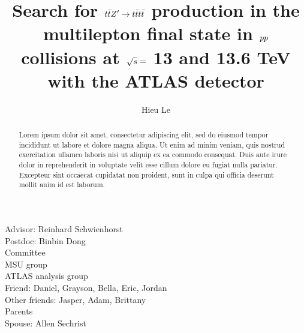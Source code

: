 \documentclass{msuphddissertation}
\author{Hieu Le} %
\title{Search for $\lowercase{\ttbar}Z' \rightarrow \lowercase{\tttt}$ production in the multilepton final state in $\lowercase{pp}$ collisions at \lowercase{$\sqrt{s}=$} 13 and 13.6 TeV with the ATLAS detector} %
\begin{document}
\maketitlepage %


\begin{abstract}
Lorem ipsum dolor sit amet, consectetur adipiscing elit, sed do eiusmod tempor incididunt ut labore et dolore magna aliqua. Ut enim ad minim veniam, quis nostrud exercitation ullamco laboris nisi ut aliquip ex ea commodo consequat. Duis aute irure dolor in reprehenderit in voluptate velit esse cillum dolore eu fugiat nulla pariatur. Excepteur sint occaecat cupidatat non proident, sunt in culpa qui officia deserunt mollit anim id est laborum.
\end{abstract}





\begin{acknowledgment}
Advisor: Reinhard Schwienhorst\\
Postdoc: Binbin Dong\\
Committee\\
MSU group\\
ATLAS analysis group\\
Friend: Daniel, Grayson, Bella, Eric, Jordan\\
Other friends: Jasper, Adam, Brittany\\
Parents\\
Spouse: Allen Sechrist
\end{acknowledgment}
\end{document}
